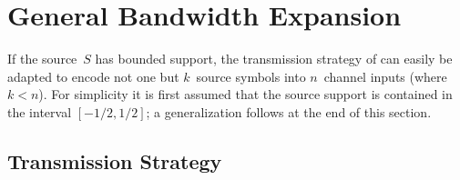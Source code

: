 \section{General Bandwidth Expansion}\label{sec:genbwexp}

If the source~$S$ has bounded support, the transmission strategy of
 can easily be adapted to encode not one but $k$~source
symbols into $n$~channel inputs (where $k < n$). For simplicity it is first
assumed that the source support is contained in the interval $[-1/2, 1/2]$; a
generalization follows at the end of this section.


\subsection{Transmission Strategy}

